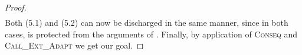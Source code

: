 \begin{proof}
\begin{align*}
\end{align*}
\normalsize
Both (5.1) and (5.2) can now be discharged in the same manner, since in both cases,  is protected from the arguments of .  Finally, by application of \textsc{Conseq} and \textsc{Call\_Ext\_Adapt} we get our goal.
%
\end{proof}



